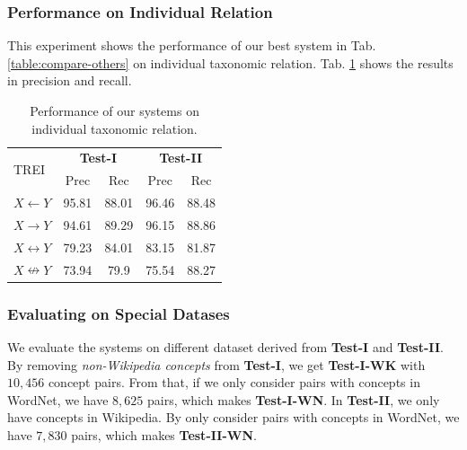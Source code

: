 \subsubsection{Performance on Individual Relation}

This experiment shows the performance of our best system in
Tab. \ref{table:compare-others} on individual taxonomic relation.
Tab. \ref{tab:ind-rel} shows the results in precision and recall.

\begin{table}[!h]
  \begin{center}
    \begin{tabular}{l|c|c||c|c}
      \multirow{2}{*}{TREI}  & \multicolumn{2}{c}{{\bf Test-I}} & \multicolumn{2}{|c}{{\bf Test-II}} \\
      \cline{2-5}
      &  Prec & Rec &  Prec &  Rec  \\
      \hline
      $X \leftarrow Y$       & 95.81 & 88.01 & 96.46 & 88.48 \\
      $X \rightarrow Y$      & 94.61 & 89.29 & 96.15 & 88.86 \\
      $X \leftrightarrow Y$  & 79.23 & 84.01 & 83.15 & 81.87 \\
      $X \nleftrightarrow Y$ & 73.94 &  79.9 & 75.54 & 88.27 \\
    \end{tabular}
    \caption{Performance of our systems on individual taxonomic relation.}
    \label{tab:ind-rel}
  \end{center}
\end{table}

\subsubsection{Evaluating on Special Datases}

We evaluate the systems on different dataset derived from {\bf Test-I}
and {\bf Test-II}.  By removing {\em non-Wikipedia concepts} from {\bf
  Test-I}, we get {\bf Test-I-WK} with $10,456$ concept pairs.  From
that, if we only consider pairs with concepts in WordNet, we have
$8,625$ pairs, which makes {\bf Test-I-WN}.  In {\bf Test-II}, we only
have concepts in Wikipedia. By only consider pairs with concepts in
WordNet, we have $7,830$ pairs, which makes {\bf Test-II-WN}.

